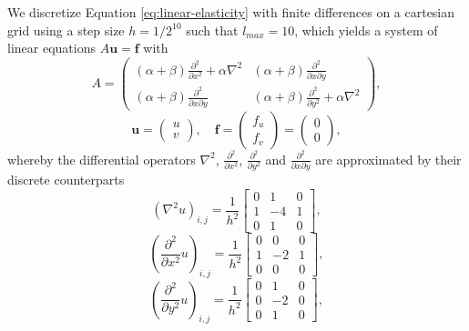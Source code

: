 We discretize Equation \eqref{eq:linear-elasticity} with finite differences on a cartesian grid using a step size $h = 1/2^{10}$ such that $l_{max} = 10$, which yields a system of linear equations $A \bm{u} = \bm{f}$ with 
\begin{equation*}
	A =
	\begin{pmatrix}
		(\alpha + \beta) \frac{\partial^2}{\partial x^2} + \alpha \nabla^2 & (\alpha + \beta) \frac{\partial^2}{\partial x \partial y} \\
		(\alpha + \beta) \frac{\partial^2}{\partial x \partial y} & (\alpha + \beta) \frac{\partial^2}{\partial y^2} +  \alpha \nabla^2
	\end{pmatrix},
\end{equation*}
\begin{equation*}
	\bm{u} = \begin{pmatrix}
		u \\ v
	\end{pmatrix}, \quad
	\bm{f} =
	\begin{pmatrix}
		f_{u} \\ f_{v}
	\end{pmatrix} =
	\begin{pmatrix}
		0 \\ 0
	\end{pmatrix},
\end{equation*}
whereby the differential operators $\nabla^2$, $\frac{\partial^2}{\partial x^2}$, $\frac{\partial^2}{\partial y^2}$ and $\frac{\partial^2}{\partial x \partial y}$ are approximated by their discrete counterparts
\begin{equation*}
	\left(\nabla^2 u\right)_{i,j} = 
	\frac{1}{h^2} \begin{bmatrix}
		0 & 1 & 0\\
		1 & -4 & 1 \\
		0 & 1 & 0  
	\end{bmatrix},
\end{equation*}
\begin{equation*}
	\left(\frac{\partial^2}{\partial x^2} u\right)_{i,j} =
		\frac{1}{h^2} \begin{bmatrix}
		0 & 0 & 0\\
		1 & -2 & 1 \\
		0 & 0 & 0  
	\end{bmatrix},
\end{equation*}
\begin{equation*}
	\left(\frac{\partial^2}{\partial y^2} u\right)_{i,j} =
	\frac{1}{h^2} \begin{bmatrix}
		0 & 1 & 0\\
		0 & -2 & 0 \\
		0 & 1 & 0  
	\end{bmatrix},
\end{equation*}
